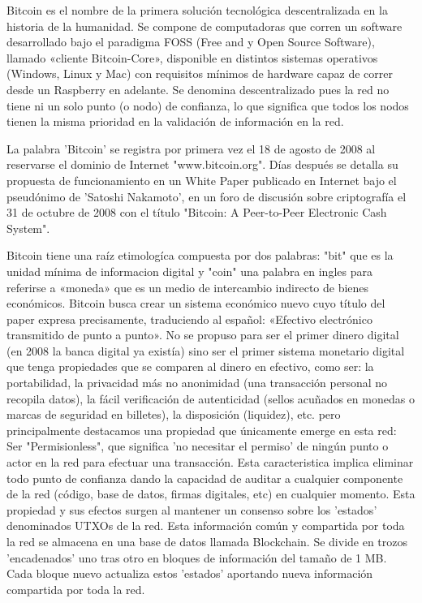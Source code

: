 \documentclass{rbf}
\begin{document}
Bitcoin es el nombre de la primera solución tecnológica descentralizada en la historia de la humanidad. Se compone de computadoras que corren un software desarrollado bajo el paradigma FOSS (Free and y Open Source Software), llamado «cliente Bitcoin-Core», disponible en distintos sistemas operativos (Windows, Linux y Mac) con requisitos mínimos de hardware capaz de correr desde un Raspberry en adelante. Se denomina descentralizado pues la red no tiene ni un solo punto (o nodo) de confianza, lo que significa que todos los nodos tienen la misma prioridad en la validación de información en la red. 


La palabra 'Bitcoin' se registra por primera vez el 18 de agosto de 2008 al reservarse el dominio de Internet "www.bitcoin.org". Días después se detalla su propuesta de funcionamiento en un White Paper publicado en Internet bajo el pseudónimo de 'Satoshi Nakamoto', en un foro de discusión sobre criptografía el 31 de octubre de 2008 con el título "Bitcoin: A Peer-to-Peer Electronic Cash System". 

Bitcoin tiene una raíz etimologíca compuesta por dos palabras: "bit" que es la unidad mínima de informacion digital y "coin" una palabra en ingles para referirse a «moneda» que es un medio de intercambio indirecto de bienes económicos. Bitcoin busca crear un sistema económico nuevo cuyo título del paper expresa precisamente, traduciendo al español: «Efectivo electrónico transmitido de punto a punto». No se propuso para ser el primer dinero digital (en 2008 la banca digital ya existía) sino ser el primer sistema monetario digital que tenga propiedades que se comparen al dinero en efectivo, como ser: la  portabilidad, la privacidad más no anonimidad (una transacción personal no recopila datos), la fácil verificación de autenticidad (sellos acuñados en monedas o marcas de seguridad en billetes),  la disposición (liquidez), etc. pero principalmente destacamos una propiedad que únicamente emerge en esta red: Ser "Permisionless", que significa 'no necesitar el permiso' de ningún punto o actor en la red para efectuar una transacción. Esta caracteristica implica eliminar todo punto de confianza dando la capacidad de auditar a cualquier componente de la red (código, base de datos, firmas digitales, etc) en cualquier momento. Esta propiedad y sus efectos surgen al mantener un consenso sobre los 'estados' denominados UTXOs de la red. Esta información común y compartida por toda la red se almacena en una base de datos llamada Blockchain. Se divide en trozos 'encadenados' uno tras otro en bloques de información del tamaño de 1 MB. Cada bloque nuevo actualiza estos 'estados' aportando nueva información compartida por toda la red.
\end{document}
